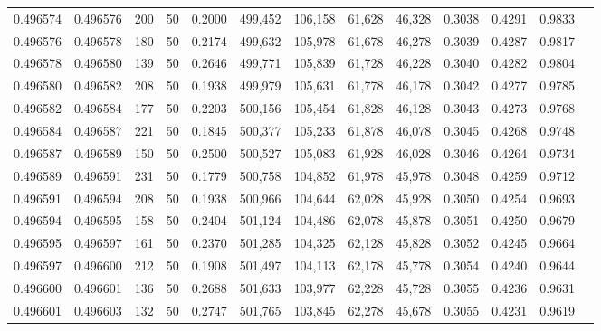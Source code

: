 \begin{tabular}{rrrrrrrrrrrrr}
0.496574 & 0.496576 &   200 &  50 &                                     0.2000 & 499,452 & 106,158 &  61,628 &  46,328 & 0.3038 & 0.4291 & 0.9833 \\
0.496576 & 0.496578 &   180 &  50 &                                     0.2174 & 499,632 & 105,978 &  61,678 &  46,278 & 0.3039 & 0.4287 & 0.9817 \\
0.496578 & 0.496580 &   139 &  50 &                                     0.2646 & 499,771 & 105,839 &  61,728 &  46,228 & 0.3040 & 0.4282 & 0.9804 \\
0.496580 & 0.496582 &   208 &  50 &                                     0.1938 & 499,979 & 105,631 &  61,778 &  46,178 & 0.3042 & 0.4277 & 0.9785 \\
0.496582 & 0.496584 &   177 &  50 &                                     0.2203 & 500,156 & 105,454 &  61,828 &  46,128 & 0.3043 & 0.4273 & 0.9768 \\
0.496584 & 0.496587 &   221 &  50 &                                     0.1845 & 500,377 & 105,233 &  61,878 &  46,078 & 0.3045 & 0.4268 & 0.9748 \\
0.496587 & 0.496589 &   150 &  50 &                                     0.2500 & 500,527 & 105,083 &  61,928 &  46,028 & 0.3046 & 0.4264 & 0.9734 \\
0.496589 & 0.496591 &   231 &  50 &                                     0.1779 & 500,758 & 104,852 &  61,978 &  45,978 & 0.3048 & 0.4259 & 0.9712 \\
0.496591 & 0.496594 &   208 &  50 &                                     0.1938 & 500,966 & 104,644 &  62,028 &  45,928 & 0.3050 & 0.4254 & 0.9693 \\
0.496594 & 0.496595 &   158 &  50 &                                     0.2404 & 501,124 & 104,486 &  62,078 &  45,878 & 0.3051 & 0.4250 & 0.9679 \\
0.496595 & 0.496597 &   161 &  50 &                                     0.2370 & 501,285 & 104,325 &  62,128 &  45,828 & 0.3052 & 0.4245 & 0.9664 \\
0.496597 & 0.496600 &   212 &  50 &                                     0.1908 & 501,497 & 104,113 &  62,178 &  45,778 & 0.3054 & 0.4240 & 0.9644 \\
0.496600 & 0.496601 &   136 &  50 &                                     0.2688 & 501,633 & 103,977 &  62,228 &  45,728 & 0.3055 & 0.4236 & 0.9631 \\
0.496601 & 0.496603 &   132 &  50 &                                     0.2747 & 501,765 & 103,845 &  62,278 &  45,678 & 0.3055 & 0.4231 & 0.9619 \\

\end{tabular}
